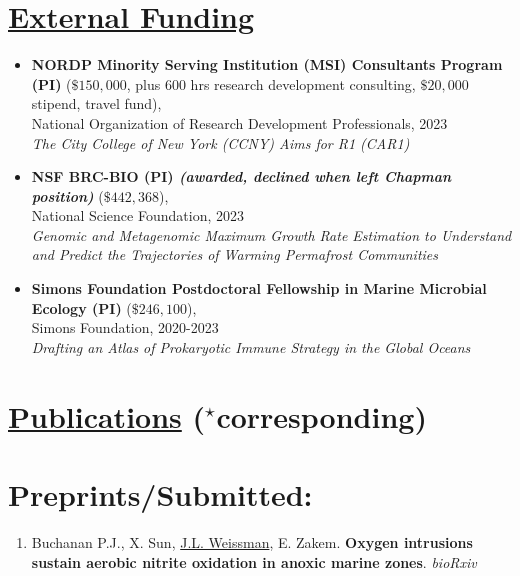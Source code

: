 \documentclass[]{res}
\begin{document}
\begin{resume}
\begin{itemize}[leftmargin=*]
 \end{itemize}
 
\section{\underline{External Funding}} %
\begin{itemize} 
\item[] {\bf NORDP Minority Serving Institution (MSI) Consultants Program (PI)} ($\$150,000$, plus 600 hrs research development consulting, $\$20,000$ stipend, travel fund),\\ National Organization of Research Development Professionals, 2023\\\emph{The City College of New York (CCNY) Aims for R1 (CAR1)}\\
\item[] {\bf NSF BRC-BIO (PI) \emph{(awarded, declined when left Chapman position)}} ($\$442,368$),\\ National Science Foundation, 2023\\\emph{Genomic and Metagenomic Maximum Growth Rate Estimation to Understand and Predict the Trajectories of Warming Permafrost Communities}\\
\item[] {\bf Simons Foundation Postdoctoral Fellowship in Marine Microbial Ecology (PI)} ($\$246,100$),\\ Simons Foundation, 2020-2023\\\emph{Drafting an Atlas of Prokaryotic Immune Strategy in the Global Oceans}
\end{itemize} 

\newpage
 
 \section{\underline{Publications} ($^\star$corresponding)} \vspace{2mm}
 
 
 \section{Preprints/Submitted:} \vspace{0mm}
  
 \begin{enumerate}[leftmargin=*]
 \setlength\itemsep{0.25em}


\item Buchanan P.J., X. Sun, \underline{J.L. Weissman}, E. Zakem. {\bf Oxygen intrusions sustain aerobic nitrite 
oxidation in anoxic marine zones}. \emph{bioRxiv}


\end{enumerate}
\end{resume}
\end{document}
